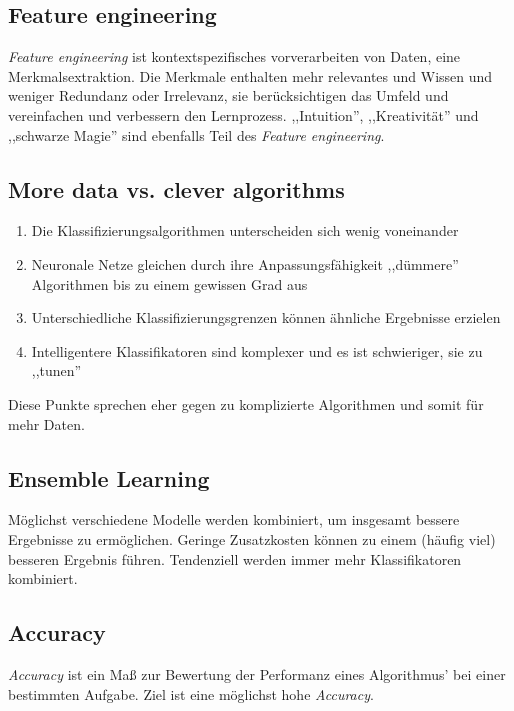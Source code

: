 \documentclass[11pt,a4paper]{article}
\begin{document}
\subsection*{Feature engineering}
\textit{Feature engineering} ist kontextspezifisches vorverarbeiten von Daten, eine Merkmalsextraktion. Die Merkmale enthalten mehr relevantes und Wissen und weniger Redundanz oder Irrelevanz, sie berücksichtigen das Umfeld und vereinfachen und verbessern den Lernprozess. ,,Intuition'', ,,Kreativität'' und
,,schwarze Magie'' sind ebenfalls Teil des \textit{Feature engineering}.

\subsection*{More data vs. clever algorithms}
\begin{enumerate}
	\item Die Klassifizierungsalgorithmen unterscheiden sich wenig voneinander
	\item Neuronale Netze gleichen durch ihre Anpassungsfähigkeit ,,dümmere'' Algorithmen bis zu einem gewissen Grad aus
	\item Unterschiedliche Klassifizierungsgrenzen können ähnliche Ergebnisse erzielen
	\item Intelligentere Klassifikatoren sind komplexer und es ist schwieriger, sie zu ,,tunen''
\end{enumerate}
Diese Punkte sprechen eher gegen zu komplizierte Algorithmen und somit für mehr Daten.

\subsection*{Ensemble Learning}
Möglichst verschiedene Modelle werden kombiniert, um insgesamt bessere Ergebnisse zu ermöglichen. Geringe Zusatzkosten können zu einem (häufig viel) besseren Ergebnis führen. Tendenziell werden immer mehr Klassifikatoren kombiniert.


\subsection*{Accuracy}
\textit{Accuracy} ist ein Maß zur Bewertung der Performanz eines Algorithmus' bei einer bestimmten Aufgabe. Ziel ist eine möglichst hohe \textit{Accuracy}.
\end{document}
